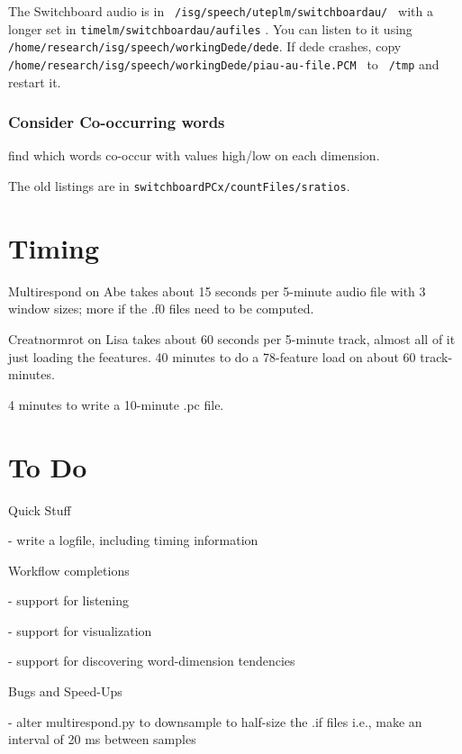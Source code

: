 \documentclass[11pt]{article}
\begin{document}
The Switchboard audio is in {\tt
 /isg/speech/uteplm/switchboardau/ } with a longer set in {\tt timelm/switchboardau/aufiles} .  You can listen
to it using {\tt /home/research/isg/speech/workingDede/dede}.  If dede
crashes, copy {\tt
  /home/research/isg/speech/workingDede/piau-au-file.PCM } to {\tt
  /tmp} and restart it.



\subsubsection{Consider Co-occurring words} 


find which words co-occur with values high/low on each dimension. 

The old listings are in {\tt              switchboardPCx/countFiles/sratios}.



\section*{Timing }

Multirespond on Abe takes about 15 seconds per 5-minute audio file
with 3 window sizes; more if the .f0 files need to be computed.

Creatnormrot on Lisa takes about 60 seconds per 5-minute track, almost
all of it just loading the feeatures.  40 minutes to do a 78-feature
load on about 60 track-minutes.

4 minutes to write a 10-minute .pc file.

\section*{To Do }

Quick Stuff

- write a logfile, including timing information


Workflow completions

- support for listening

- support for visualization 

- support for discovering word-dimension tendencies


Bugs and Speed-Ups 

- alter multirespond.py to downsample to half-size the .if files
  i.e., make an interval of 20 ms between samples
\end{document}
